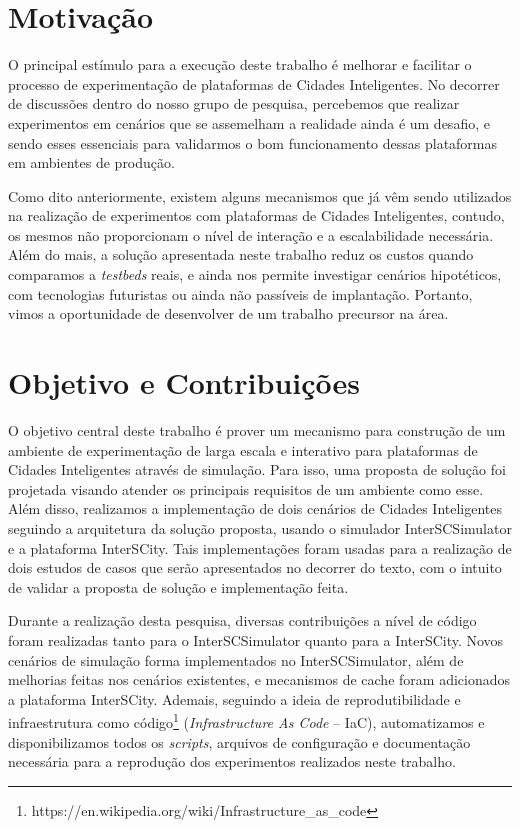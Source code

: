 \section{Motivação}

O principal estímulo para a execução deste trabalho é melhorar e facilitar o processo de experimentação de plataformas de Cidades Inteligentes.
No decorrer de discussões dentro do nosso grupo de pesquisa, percebemos que realizar experimentos em cenários que se assemelham a realidade ainda é um desafio, e sendo esses essenciais para validarmos o bom
funcionamento dessas plataformas em ambientes de produção.

Como dito anteriormente, existem alguns mecanismos que já vêm sendo utilizados na realização de experimentos com plataformas de Cidades Inteligentes, contudo, os mesmos não proporcionam o nível de interação
e a escalabilidade necessária.
Além do mais, a solução apresentada neste trabalho reduz os custos quando comparamos a \textit{testbeds} reais, e ainda nos permite investigar cenários hipotéticos, com tecnologias futuristas ou ainda não
passíveis de implantação.
Portanto, vimos a oportunidade de desenvolver de um trabalho precursor na área.

\section{Objetivo e Contribuições}

O objetivo central deste trabalho é prover um mecanismo para construção de um ambiente de experimentação de larga escala e interativo para plataformas de Cidades Inteligentes através de simulação.
Para isso, uma proposta de solução foi projetada visando atender os principais requisitos de um ambiente como esse.
Além disso, realizamos a implementação de dois cenários de Cidades Inteligentes seguindo a arquitetura da solução proposta, usando o simulador InterSCSimulator e a plataforma InterSCity.
Tais implementações foram usadas para a realização de dois estudos de casos que serão apresentados no decorrer do texto, com o intuito de validar a proposta de solução e implementação feita.

Durante a realização desta pesquisa, diversas contribuições a nível de código foram realizadas tanto para o InterSCSimulator quanto para a InterSCity.
Novos cenários de simulação forma implementados no InterSCSimulator, além de melhorias feitas nos cenários existentes, e mecanismos de cache foram adicionados a plataforma InterSCity.
Ademais, seguindo a ideia de reprodutibilidade e infraestrutura como código\footnote{https://en.wikipedia.org/wiki/Infrastructure\_as\_code} (\textit{Infrastructure As Code} -- IaC), automatizamos e
disponibilizamos todos os \textit{scripts}, arquivos de configuração e documentação necessária para a reprodução dos experimentos realizados neste trabalho.


